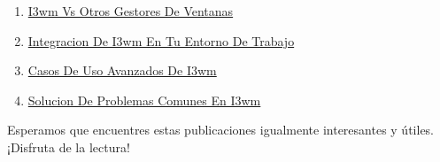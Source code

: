 \documentclass[
  jou,
  floatsintext,
  longtable,
  a4paper,
  nolmodern,
  notxfonts,
  notimes,
  colorlinks=true,linkcolor=blue,citecolor=blue,urlcolor=blue]{apa7}
\begin{document}
\begin{enumerate}
\item
  \href{https://achalmaedison.netlify.app/tecnologia-seguridad/i3wm/2020-02-20-i3wm-vs-otros-gestores-de-ventanas/index.pdf}{}
  \href{https://achalmaedison.netlify.app/tecnologia-seguridad/i3wm/2020-02-20-i3wm-vs-otros-gestores-de-ventanas}{I3wm
  Vs Otros Gestores De Ventanas}
\item
  \href{https://achalmaedison.netlify.app/tecnologia-seguridad/i3wm/2020-02-21-integracion-de-i3wm-en-tu-entorno-de-trabajo/index.pdf}{}
  \href{https://achalmaedison.netlify.app/tecnologia-seguridad/i3wm/2020-02-21-integracion-de-i3wm-en-tu-entorno-de-trabajo}{Integracion
  De I3wm En Tu Entorno De Trabajo}
\item
  \href{https://achalmaedison.netlify.app/tecnologia-seguridad/i3wm/2020-02-22-casos-de-uso-avanzados-de-i3wm/index.pdf}{}
  \href{https://achalmaedison.netlify.app/tecnologia-seguridad/i3wm/2020-02-22-casos-de-uso-avanzados-de-i3wm}{Casos
  De Uso Avanzados De I3wm}
\item
  \href{https://achalmaedison.netlify.app/tecnologia-seguridad/i3wm/2020-02-23-solucion-de-problemas-comunes-en-i3wm/index.pdf}{}
  \href{https://achalmaedison.netlify.app/tecnologia-seguridad/i3wm/2020-02-23-solucion-de-problemas-comunes-en-i3wm}{Solucion
  De Problemas Comunes En I3wm}
\end{enumerate}

Esperamos que encuentres estas publicaciones igualmente interesantes y
útiles. ¡Disfruta de la lectura!
\end{document}
